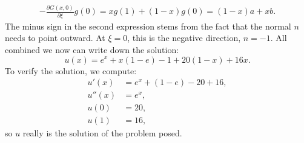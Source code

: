 \begin{loesung}
\begin{align*}
-
\frac{\partial G(x,0)}{\partial\xi} g(0)
=
xg(1) + (1-x)g(0)
=
(1-x)a
+
xb.
\end{align*}
The minus sign in the second expression stems from the fact that
the normal $n$ needs to point outward. 
At $\xi=0$, this is the negative direction, $n=-1$.
All combined we now can write down the solution:
\[
u(x)
=
e^x+x(1-e)-1
+20(1-x)+16x.
\]
To verify the solution, we compute:
\begin{align*}
u'(x)
&=
e^x+(1-e)-20+16,
\\
u''(x)
&=
e^x,
\\
u(0)
&=
20,
\\
u(1)
&=
16,
\end{align*}
so $u$ really is the solution of the problem posed.
\end{loesung}

